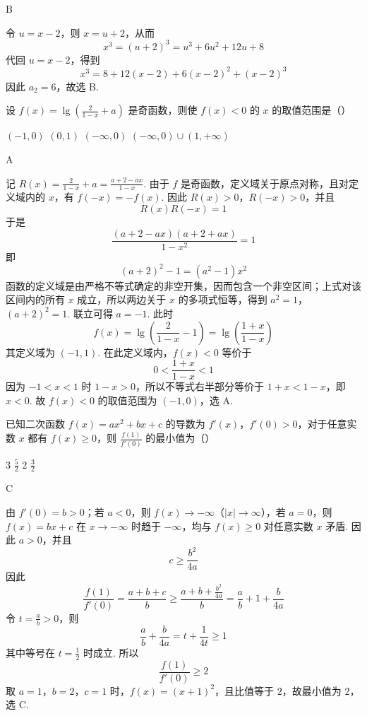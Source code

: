 \begin{answer}
B
\end{answer}

\begin{solution}
令 \(u=x-2\)，则 \(x=u+2\)，从而
\[
x^{3}=(u+2)^{3}=u^{3}+6u^{2}+12u+8
\]
代回 \(u=x-2\)，得到
\[
x^{3}=8+12(x-2)+6(x-2)^{2}+(x-2)^{3}
\]
因此 \(a_{2}=6\)，故选 B.
\end{solution}

\begin{problem}
设 \(f(x) = \lg \left(\frac{2}{1 - x} + a\right)\) 是奇函数，则使 \(f(x) < 0\) 的 \(x\) 的取值范围是（\quad）

\choices
    {\((-1, 0)\)}
    {\((0, 1)\)}
    {\((-\infty, 0)\)}
    {\((-\infty, 0) \cup (1, +\infty)\)}
\end{problem}

\begin{answer}
A
\end{answer}

\begin{solution}
记 \(R(x)=\frac{2}{1-x}+a=\frac{a+2-ax}{1-x}\). 由于 \(f\) 是奇函数，定义域关于原点对称，且对定义域内的 \(x\)，有 \(f(-x)=-f(x)\). 因此 \(R(x)>0\)，\(R(-x)>0\)，并且
\[
R(x)R(-x)=1
\]
于是
\[
\frac{(a+2-ax)(a+2+ax)}{1-x^{2}}=1
\]
即
\[
(a+2)^{2}-1=(a^{2}-1)x^{2}
\]
函数的定义域是由严格不等式确定的非空开集，因而包含一个非空区间；上式对该区间内的所有 \(x\) 成立，所以两边关于 \(x\) 的多项式恒等，得到 \(a^{2}=1\)，\((a+2)^{2}=1\). 联立可得 \(a=-1\). 此时
\[
f(x)=\lg\left(\frac{2}{1-x}-1\right)=\lg\left(\frac{1+x}{1-x}\right)
\]
其定义域为 \((-1,1)\). 在此定义域内，\(f(x)<0\) 等价于
\[
0<\frac{1+x}{1-x}<1
\]
因为 \(-1<x<1\) 时 \(1-x>0\)，所以不等式右半部分等价于 \(1+x<1-x\)，即 \(x<0\). 故 \(f(x)<0\) 的取值范围为 \((-1,0)\)，选 A.
\end{solution}

\begin{problem}
已知二次函数 \(f(x) = ax^{2} + bx + c\) 的导数为 \(f'(x)\)，\(f'(0) > 0\)，对于任意实数 \(x\) 都有 \(f(x) \geqslant 0\)，则 \(\frac{f(1)}{f'(0)}\) 的最小值为（\quad）

\choices
    {\(3\)}
    {\(\frac{5}{2}\)}
    {\(2\)}
    {\(\frac{3}{2}\)}
\end{problem}

\begin{answer}
C
\end{answer}

\begin{solution}
由 \(f'(0)=b>0\)；若 \(a<0\)，则 \(f(x)\to-\infty\)（\(\lvert x\rvert\to\infty\)），若 \(a=0\)，则 \(f(x)=bx+c\) 在 \(x\to-\infty\) 时趋于 \(-\infty\)，均与 \(f(x)\geqslant0\) 对任意实数 \(x\) 矛盾. 因此 \(a>0\)，并且
\[
c\geqslant\frac{b^{2}}{4a}
\]
因此
\[
\frac{f(1)}{f'(0)}=\frac{a+b+c}{b}
\geqslant\frac{a+b+\frac{b^{2}}{4a}}{b}
=\frac{a}{b}+1+\frac{b}{4a}
\]
令 \(t=\frac{a}{b}>0\)，则
\[
\frac{a}{b}+\frac{b}{4a}=t+\frac{1}{4t}\geqslant1
\]
其中等号在 \(t=\frac{1}{2}\) 时成立. 所以
\[
\frac{f(1)}{f'(0)}\geqslant2
\]
取 \(a=1\)，\(b=2\)，\(c=1\) 时，\(f(x)=(x+1)^{2}\)，且比值等于 \(2\)，故最小值为 \(2\)，选 C.
\end{solution}

